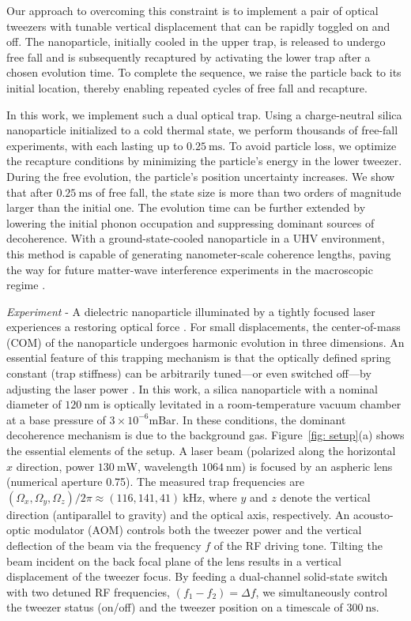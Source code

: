 \documentclass[twocolumn,preprintnumbers,superscriptaddress,amsmath,amssymb,aps,pra,10pt]{revtex4-1}
\newcommand{\<}{\langle}
\renewcommand{\>}{\rangle}
\renewcommand{\>}{\rangle}
\begin{document}
Our approach to overcoming this constraint is to implement a pair of optical tweezers with tunable vertical displacement that can be rapidly toggled on and off.
%
The nanoparticle, initially cooled in the upper trap, is released to undergo free fall and is subsequently recaptured by activating the lower trap after a chosen evolution time.
%
To complete the sequence, we raise the particle back to its initial location, thereby enabling repeated cycles of free fall and recapture.


In this work, we implement such a dual optical trap.
%
Using a charge-neutral silica nanoparticle initialized to a cold thermal state, we perform thousands of free-fall experiments, with each lasting up to $0.25~\mathrm{ms}$.
%
To avoid particle loss, we optimize the recapture conditions by minimizing the particle’s energy in the lower tweezer.
%
During the free evolution, the particle’s position uncertainty increases.
%
We show that after $0.25~\mathrm{ms}$ of free fall, the state size is more than two orders of magnitude larger than the initial one.
%
The evolution time can be further extended by lowering the initial phonon occupation and suppressing dominant sources of decoherence.
%
With a ground-state-cooled nanoparticle in a UHV environment, this method is capable of generating nanometer-scale coherence lengths, paving the way for future matter-wave interference experiments in the macroscopic regime \cite{Romero-Isart2011b,Gonzalez-Ballestero2021,Neumeier2024}.



\textit{Experiment} - A dielectric nanoparticle illuminated by a tightly focused laser experiences a restoring optical force \cite{Romero-Isart2011a}.
%
For small displacements, the center-of-mass (COM) of the nanoparticle undergoes harmonic evolution in three dimensions.
%
An essential feature of this trapping mechanism is that the optically defined spring constant (trap stiffness) can be arbitrarily tuned—or even switched off—by adjusting the laser power \cite{Millen2020}.
%
In this work, a silica nanoparticle with a nominal diameter of $120~\mathrm{nm}$ is optically levitated in a room-temperature vacuum chamber at a base pressure of $3\times 10^{-6}\mathrm{mBar}$.
%
In these conditions, the dominant decoherence mechanism is due to the background gas.
%
Figure~\ref{fig: setup}(a) shows the essential elements of the setup.
%
A laser beam (polarized along the horizontal $x$ direction, power $130~\mathrm{mW}$, wavelength $1064~\mathrm{nm}$) is focused by an aspheric lens (numerical aperture 0.75). 
%
The measured trap frequencies are $(\Omega_x,\Omega_y,\Omega_z)/2\pi\approx (116,141,41)~\text{kHz}$, where $y$ and $z$ denote the vertical direction (antiparallel to gravity) and the optical axis, respectively.
%
An acousto-optic modulator (AOM) controls both the tweezer power and the vertical deflection of the beam via the frequency $f$ of the RF driving tone.
%
Tilting the beam incident on the back focal plane of the lens results in a vertical displacement of the tweezer focus.
%
By feeding a dual-channel solid-state switch with two detuned RF frequencies, $(f_1 - f_2) = \Delta f$, we simultaneously control the tweezer status (on/off) and the tweezer position on a timescale of $300~\mathrm{ns}$.
\end{document}
